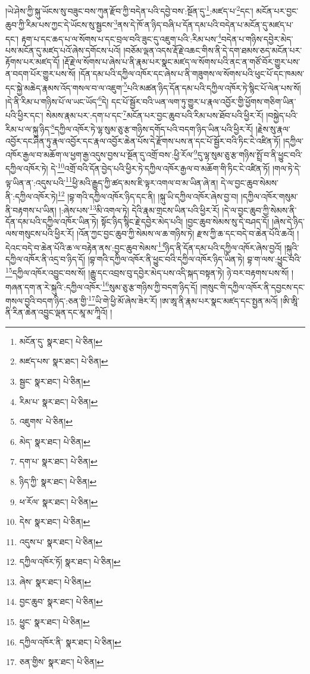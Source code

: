 །ཡེ་ཤེས་ཀྱི་སྐུ་ཡོངས་སུ་བཟུང་བས་ཀུན་རྫོབ་ཀྱི་བདེན་པའི་དབྱེ་བས་:སྔོན་དུ་\footnote{མངོན་དུ་  སྣར་ཐང་།  པེ་ཅིན། }:མཛད་པ་\footnote{མཛད་པས་  སྣར་ཐང་།  པེ་ཅིན། }དང་། མངོན་པར་བྱང་ཆུབ་ཀྱི་རིམ་པས་ཀྱང་དེ་ཡོངས་སུ་སྦྱངས་\footnote{སྦྱང་  སྣར་ཐང་།  པེ་ཅིན། }ནས་དེ་ཁོ་ན་ཉིད་བཞི་པ་དོན་དམ་པའི་བདེན་པ་མངོན་དུ་མཛད་པ་དང་། རྟག་པ་དང་ཆད་པ་ལ་སོགས་པ་དང་བྲལ་བའི་ཟུང་དུ་འཇུག་པའི་:རིམ་པས་\footnote{རིམ་པ་  སྣར་ཐང་།  པེ་ཅིན། }བདེན་པ་གཉིས་དབྱེར་མེད་པས་མངོན་དུ་མཛད་པའོ་ཞེས་དགོངས་པའོ། །བཅོམ་ལྡན་འདས་རྡོ་རྗེ་འཆང་གིས་ནི་དེ་དག་ཐམས་ཅད་མངོན་པར་རྟོགས་པར་མཛད་དོ། །རྡོ་རྗེ་ལ་སོགས་པ་ཞེས་པ་ནི་རྣམ་པར་སྣང་མཛད་ལ་སོགས་པའི་ནང་ན་གཙོ་བོར་གྱུར་པས་ན་བདག་པོར་གྱུར་པས་སོ། །དོན་དམ་པའི་དཀྱིལ་འཁོར་དང་ཞེས་པ་ནི་གཟུགས་ལ་སོགས་པའི་ཕུང་པོ་དང་ཁམས་དང་སྐྱེ་མཆེད་རྣམས་འོད་གསལ་བ་ལ་འཇུག་\footnote{འཇུགས་  པེ་ཅིན། }པའི་མཚན་ཉིད་དོན་དམ་པའི་དཀྱིལ་འཁོར་ཏེ་སྙིང་པོ་ལེན་པས་སོ། །དེ་ནི་རིམ་པ་གཉིས་པོ་ལ་ཡང་ཡོད་\footnote{མེད་  སྣར་ཐང་།  པེ་ཅིན། }དེ། དང་པོ་སྦྱོར་བའི་ཡན་ལག་ཏུ་གྱུར་པ་རྣལ་འབྱོར་གྱི་ཕྱོགས་གཅིག་ཡིན་པའི་ཕྱིར་དང་། སེམས་རྣམ་པར་:དག་པ་དང་\footnote{དག་པ་  སྣར་ཐང་།  པེ་ཅིན། }མངོན་པར་བྱང་ཆུབ་པའི་རིམ་པས་ཐོབ་པའི་ཕྱིར་རོ། །བསྐྱེད་པའི་རིམ་པ་ལ་སྐུ་ཉིད་\footnote{ཉིད་ཀྱི་  སྣར་ཐང་།  པེ་ཅིན། }དཀྱིལ་འཁོར་ཏེ་ལྷ་སུམ་ཅུ་རྩ་གཉིས་དགོད་པའི་བདག་ཉིད་ཡིན་པའི་ཕྱིར་རོ། །རྗེས་སུ་རྣལ་འབྱོར་དང་ཤིན་ཏུ་རྣལ་འབྱོར་དང་རྣལ་འབྱོར་ཆེན་པོས་དེ་རྫོགས་པས་ན་དང་པོ་སྦྱོར་བའི་ཏིང་ངེ་འཛིན་ཏོ། །དཀྱིལ་འཁོར་རྒྱལ་བ་མཆོག་ལ་ཕྱག་རྒྱ་འདུས་བྱས་པ་སྔོན་དུ་འགྲོ་བས་:ཕྱི་རོལ་\footnote{ཕ་རོལ་  སྣར་ཐང་།  པེ་ཅིན། }དུ་ལྷ་སུམ་ཅུ་རྩ་གཉིས་སྤྲོ་བ་ནི་ཕྱུང་བའི་དཀྱིལ་འཁོར་ཏེ། དེ་\footnote{དེས་  སྣར་ཐང་།  པེ་ཅིན། }འགྲོ་བའི་དོན་བྱེད་པའི་ཕྱིར་ཏེ་དཀྱིལ་འཁོར་རྒྱལ་བ་མཆོག་གི་ཏིང་ངེ་འཛིན་ཏོ། །གལ་ཏེ་དེ་ལྟ་ཡིན་ན་:འདུས་པའི་\footnote{འདུས་པ་  སྣར་ཐང་།  པེ་ཅིན། }ཕྱི་མའི་རྒྱུད་ཀྱི་ཚད་མས་ཇི་ལྟར་འགལ་བ་མ་ཡིན་ཞེ་ན། དེ་ལ་བྱང་ཆུབ་སེམས་ནི་:དཀྱིལ་འཁོར་ཏེ།\footnote{དཀྱིལ་འཁོར་ཏོ།  སྣར་ཐང་།  པེ་ཅིན། } །བྷ་གའི་དཀྱིལ་འཁོར་ཉིད་དང་ནི། །སྐུ་ཡི་དཀྱིལ་འཁོར་ཞེས་བྱ་བ། །དཀྱིལ་འཁོར་གསུམ་ནི་བརྟགས་པ་ཡིན། །:ཞེས་པས་\footnote{ཞེས་  སྣར་ཐང་།  པེ་ཅིན། }མི་འགལ་ཏེ། དེའི་རྣམ་གྲངས་ཡིན་པའི་ཕྱིར་རོ། །དེ་ལ་བྱང་ཆུབ་ཀྱི་སེམས་ནི་དོན་དམ་པའི་དཀྱིལ་འཁོར་ཡིན་ཏེ། སྟོང་ཉིད་སྙིང་རྗེ་དབྱེར་མེད་པའི། །བྱང་ཆུབ་སེམས་སུ་དེ་བཤད་དོ། །ཞེས་དེ་ཉིད་ལས་གསུངས་པའི་ཕྱིར་རོ། །འོན་ཀྱང་བྱང་ཆུབ་ཀྱི་སེམས་ལ་ཆ་གཉིས་ཏེ། རྫས་ཀྱི་ཆ་དང་བདེ་བ་ཆེན་པོའི་ཆའོ། །དེའང་བདེ་བ་ཆེན་པོའི་ཆ་ལ་བརྟེན་ནས་:བྱང་ཆུབ་སེམས་\footnote{བྱང་ཆུབ་  སྣར་ཐང་།  པེ་ཅིན། }ཉིད་ནི་དོན་དམ་པའི་དཀྱིལ་འཁོར་ཞེས་བྱའོ། །སྐུའི་དཀྱིལ་འཁོར་ནི་འདྲ་བ་ཉིད་དོ། །བྷ་གའི་དཀྱིལ་འཁོར་ནི་ཕྱུང་བའི་དཀྱིལ་འཁོར་ཉིད་ཡིན་ཏེ། བྷ་ག་ལས་:ཕྱུང་བའི་\footnote{ཕྱུང་  སྣར་ཐང་།  པེ་ཅིན། }དཀྱིལ་འཁོར་འབྱུང་བས་སོ། །རྒྱུ་དང་འབྲས་བུ་དབྱེར་མེད་པས་འདི་སྐད་བསྟན་ཏེ། ཉེ་བར་བརྟགས་པས་སོ། །གཞན་དག་ན་རེ་སྐུའི་:དཀྱིལ་འཁོར་\footnote{དཀྱིལ་འཁོར་ནི་  སྣར་ཐང་།  པེ་ཅིན། }སུམ་ཅུ་རྩ་གཉིས་ཀྱི་བདག་ཉིད་དོ། །གསུང་གི་དཀྱིལ་འཁོར་ནི་དབྱངས་དང་གསལ་བྱའི་བདག་ཉིད་:ཅན་གྱི་\footnote{ཅན་གྱིས་  སྣར་ཐང་།  པེ་ཅིན། }ཡི་གེ་ཕྱི་མོ་ཞེས་ཟེར་རོ། །ཨ་ཨཱ་ནི་རྣམ་པར་སྣང་མཛད་དང་སྤྱན་མའོ། །ཨི་ཨཱི་ནི་རིན་ཆེན་འབྱུང་ལྡན་དང་མཱ་མ་ཀཱིའོ། །

